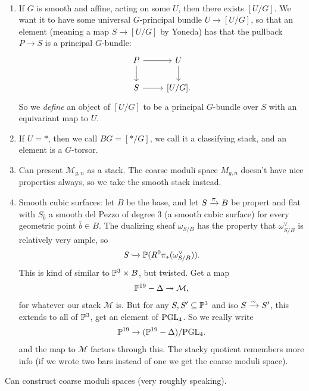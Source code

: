 \documentclass[11pt]{amsart}
\begin{document}
\begin{example} \,
\begin{enumerate}
    \item If $G$ is smooth and affine, acting on some $U$, then there exists $[U/G]$. We want it to have some universal $G$-principal bundle $U \to [U/G]$, so that an element (meaning a map $S \to [U/G]$ by Yoneda) has that the pullback $P \to S$ is a principal $G$-bundle:
\[ \begin{tikzcd}
    P\rar\dar & U\dar\\
    S\rar & {[U/G]}.
\end{tikzcd} \]
So we \textit{define} an object of $[U/G]$ to be a principal $G$-bundle over $S$ with an equivariant map to $U$.

\item If $U = \ast$, then we call $BG = [\ast/G]$, we call it a classifying stack, and an element is a $G$-torsor.

\item Can present $\mathcal{M}_{g,n}$ as a stack. The coarse moduli space $M_{g,n}$ doesn't have nice properties always, so we take the smooth stack instead.

\item Smooth cubic surfaces: let $B$ be the base, and let $S \xto{\pi} B$ be propert and flat with $S_{\bar{b}}$ a smooth del Pezzo of degree 3 (a smooth cubic surface) for every geometric point $\bar{b}\in B$. The dualizing sheaf $\omega_{S/B}$ has the property that $\omega_{S/B}^\vee$ is relatively very ample, so
\begin{align*}
    S \hookto \mathbb{P}(R^0\pi_\ast(\omega_{S/B}^\vee)).
\end{align*}
This is kind of similar to $\P^3 \times B$, but twisted. Get a map
\begin{align*}
    \P^{19}-\Delta \tto \mathcal{M},
\end{align*}
for whatever our stack $\mathcal{M}$ is. But for any $S, S' \subseteq \P^3$ and iso $S \xto{\sim} S'$, this extends to all of $\P^3$, get an element of $\PGL_4$. So we really write
\begin{align*}
   \P^{19} \to (\P^{19}-\Delta) / \PGL_4.
\end{align*}
and the map to $\mathcal{M}$ factors through this. The stacky quotient remembers more info (if we wrote two bars instead of one we get the coarse moduli space).
\end{enumerate}
\end{example}

\begin{theorem} Can construct coarse moduli spaces (very roughly speaking).
\end{theorem}
\end{document}
